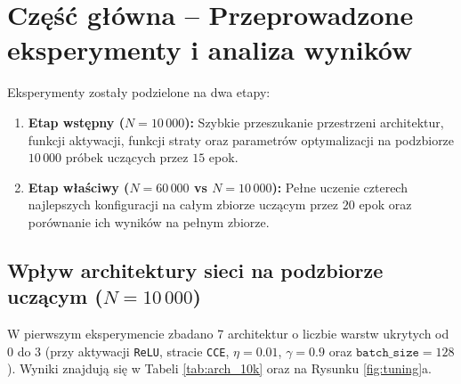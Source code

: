 \documentclass{article}
\begin{document}

\newpage

\section{Część główna -- Przeprowadzone eksperymenty i analiza wyników}

Eksperymenty zostały podzielone na dwa etapy:
\begin{enumerate}
    \item \textbf{Etap wstępny ($N = 10\,000$):} Szybkie przeszukanie przestrzeni architektur, funkcji aktywacji, funkcji straty oraz parametrów optymalizacji na podzbiorze $10\,000$ próbek uczących przez $15$ epok.
    \item \textbf{Etap właściwy ($N = 60\,000$ vs $N = 10\,000$):} Pełne uczenie czterech najlepszych konfiguracji na całym zbiorze uczącym przez $20$ epok oraz porównanie ich wyników na pełnym zbiorze.
\end{enumerate}

\subsection{Wpływ architektury sieci na podzbiorze uczącym ($N = 10\,000$)}

W pierwszym eksperymencie zbadano 7 architektur o liczbie warstw ukrytych od $0$ do $3$ (przy aktywacji \texttt{ReLU}, stracie \texttt{CCE}, $\eta = 0.01$, $\gamma = 0.9$ oraz $\texttt{batch\_size} = 128$). Wyniki znajdują się w Tabeli \ref{tab:arch_10k} oraz na Rysunku \ref{fig:tuning}a.
\end{document}
